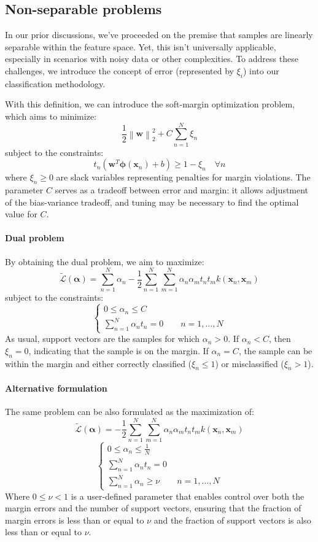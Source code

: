 \subsection{Non-separable problems}
In our prior discussions, we've proceeded on the premise that samples are linearly separable within the feature space. 
Yet, this isn't universally applicable, especially in scenarios with noisy data or other complexities. 
To address these challenges, we introduce the concept of error (represented by $\xi_i$) into our classification methodology.

With this definition, we can introduce the soft-margin optimization problem, which aims to minimize:
\[\dfrac{1}{2}\left\lVert \textbf{w} \right\rVert_2^2+C\sum_{n=1}^{N}\xi_n \]
subject to the constraints:
\[t_n\left(\mathbf{w}^T\boldsymbol{\phi}(\mathbf{x}_n)+b\right) \geq 1-\xi_n \quad \forall n\]
where $\xi_n \geq 0$ are slack variables representing penalties for margin violations.
The parameter $C$ serves as a tradeoff between error and margin: it allows adjustment of the bias-variance tradeoff, and tuning may be necessary to find the optimal value for $C$.

\paragraph*{Dual problem}
By obtaining the dual problem, we aim to maximize:
\[\tilde{\mathcal{L}}(\boldsymbol{\alpha})=\sum_{n=1}^{N}\alpha_n-\dfrac{1}{2}\sum_{n=1}^{N}\sum_{m=1}^N{\alpha_n \alpha_m t_n t_m k(\mathbf{x}_n, \mathbf{x}_m)}\]
subject to the constraints:
\[\begin{cases}
    0 \leq \alpha_n \leq C \\
    \sum_{n=1}^{N}\alpha_n t_n = 0 \qquad n=1,\dots,N
\end{cases}\]
As usual, support vectors are the samples for which $\alpha_n > 0$.
If $\alpha_n < C$, then $\xi_n = 0$, indicating that the sample is on the margin.
If $\alpha_n = C$, the sample can be within the margin and either correctly classified ($\xi_n \leq 1$) or misclassified ($\xi_n > 1$).

\paragraph*{Alternative formulation}
The same problem can be also formulated as the maximization of: 
\[\tilde{\mathcal{L}}(\boldsymbol{\alpha})=-\dfrac{1}{2}\sum_{n=1}^{N}\sum_{m=1}^N{\alpha_n \alpha_m t_n t_m k(\mathbf{x}_n, \mathbf{x}_m)}\]
\[\begin{cases}
    0 \leq \alpha_n \leq \frac{1}{N} \\
    \sum_{n=1}^{N}\alpha_n t_n = 0  \\
    \sum_{n=1}^{N}\alpha_n\geq \nu \qquad n=1,\dots,N
\end{cases}\]
Where $0\leq\nu<1$ is a user-defined parameter that enables control over both the margin errors and the number of support vectors, ensuring that the fraction of margin errors is less than or equal to $\nu$ and the fraction of support vectors is also less than or equal to $\nu$.

